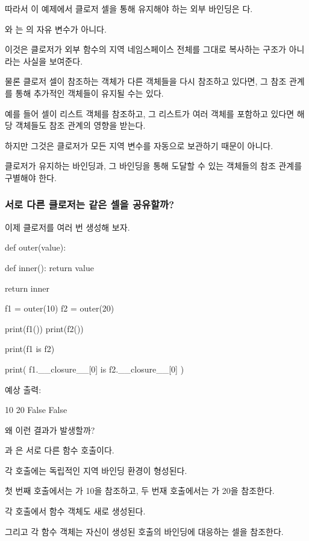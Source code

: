 따라서 이 예제에서 클로저 셀을 통해 유지해야 하는 외부 바인딩은 다.

와 는 의 자유 변수가 아니다.

이것은 클로저가 외부 함수의 지역 네임스페이스 전체를 그대로 복사하는 구조가 아니라는 사실을 보여준다.

물론 클로저 셀이 참조하는 객체가 다른 객체들을 다시 참조하고 있다면, 그 참조 관계를 통해 추가적인 객체들이 유지될 수는 있다.

예를 들어 셀이 리스트 객체를 참조하고, 그 리스트가 여러 객체를 포함하고 있다면 해당 객체들도 참조 관계의 영향을 받는다.

하지만 그것은 클로저가 모든 지역 변수를 자동으로 보관하기 때문이 아니다.

클로저가 유지하는 바인딩과, 그 바인딩을 통해 도달할 수 있는 객체들의 참조 관계를 구별해야 한다.

\subsubsection{서로 다른 클로저는 같은 셀을 공유할까?}

이제 클로저를 여러 번 생성해 보자.

\begin{dhkcode}
def outer(value):

    def inner():
        return value

    return inner


f1 = outer(10)
f2 = outer(20)

print(f1())
print(f2())

print(f1 is f2)

print(
    f1.__closure__[0]
    is f2.__closure__[0]
)
\end{dhkcode}

예상 출력:

\begin{dhkzsh}
10
20
False
False
\end{dhkzsh}

왜 이런 결과가 발생할까?

과 은 서로 다른 함수 호출이다.

각 호출에는 독립적인 지역 바인딩 환경이 형성된다.

첫 번째 호출에서는 가 10을 참조하고, 두 번재 호출에서는 가 20을 참조한다.

각 호출에서  함수 객체도 새로 생성된다.

그리고 각 함수 객체는 자신이 생성된 호출의  바인딩에 대응하는 셀을 참조한다.

